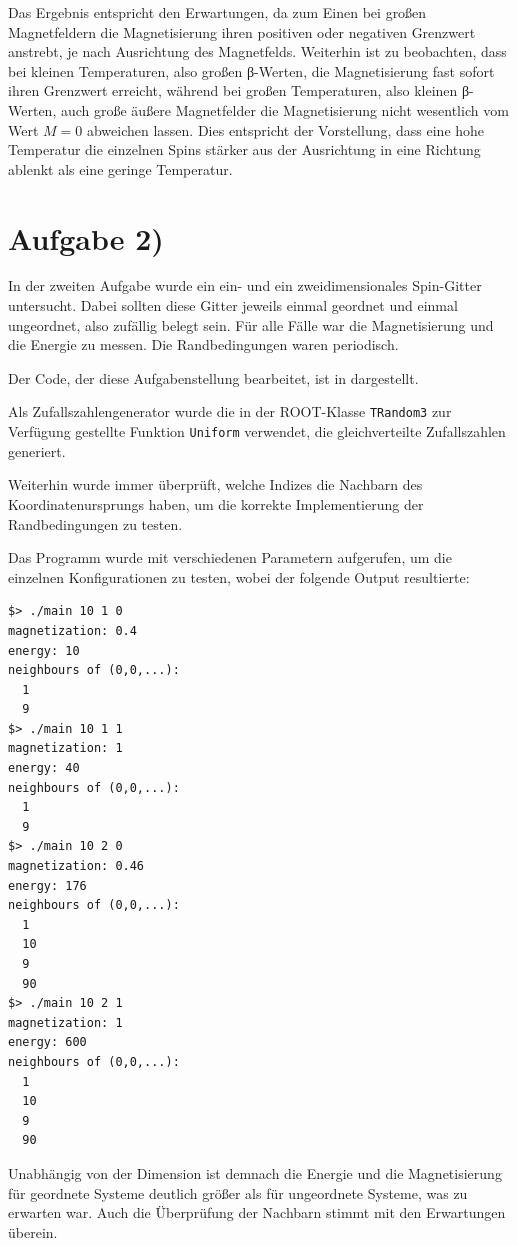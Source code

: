 Das Ergebnis entspricht den Erwartungen, da zum Einen bei großen Magnetfeldern die Magnetisierung
ihren positiven oder negativen Grenzwert anstrebt, je nach Ausrichtung des Magnetfelds.
Weiterhin ist zu beobachten, dass bei kleinen Temperaturen, also großen β-Werten,
die Magnetisierung fast sofort ihren Grenzwert erreicht, während bei großen Temperaturen,
also kleinen β-Werten, auch große äußere Magnetfelder die Magnetisierung nicht 
wesentlich vom Wert $M=0$ abweichen lassen. Dies entspricht der Vorstellung, dass
eine hohe Temperatur die einzelnen Spins stärker aus der Ausrichtung in eine
Richtung ablenkt als eine geringe Temperatur.

\section*{Aufgabe 2)}

In der zweiten Aufgabe wurde ein ein- und ein zweidimensionales Spin-Gitter untersucht.
Dabei sollten diese Gitter jeweils einmal geordnet und einmal ungeordnet, also
zufällig belegt sein. Für alle Fälle war die Magnetisierung und die Energie zu messen.
Die Randbedingungen waren periodisch.

Der Code, der diese Aufgabenstellung bearbeitet, ist in  dargestellt.



Als Zufallszahlengenerator wurde die in der ROOT-Klasse \texttt{TRandom3} zur
Verfügung gestellte Funktion \texttt{Uniform} verwendet, die gleichverteilte Zufallszahlen
generiert.

Weiterhin wurde immer überprüft, welche Indizes die Nachbarn des Koordinatenursprungs haben,
um die korrekte Implementierung der Randbedingungen zu testen.

Das Programm wurde mit verschiedenen Parametern aufgerufen, um die einzelnen
Konfigurationen zu testen, wobei der folgende Output resultierte:

\begin{lstlisting}[caption=Aufruf und Output von \lref{main},label=lst:output]
$> ./main 10 1 0
magnetization: 0.4
energy: 10
neighbours of (0,0,...):
  1
  9
$> ./main 10 1 1
magnetization: 1
energy: 40
neighbours of (0,0,...):
  1
  9
$> ./main 10 2 0
magnetization: 0.46
energy: 176
neighbours of (0,0,...):
  1
  10
  9
  90
$> ./main 10 2 1
magnetization: 1
energy: 600
neighbours of (0,0,...):
  1
  10
  9
  90
\end{lstlisting}
Unabhängig von der Dimension ist demnach die Energie und die Magnetisierung für
geordnete Systeme deutlich größer als für ungeordnete Systeme, was zu erwarten
war. Auch die Überprüfung der Nachbarn stimmt mit den Erwartungen überein. 